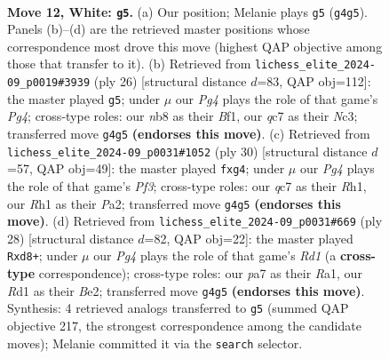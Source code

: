 \documentclass[11pt]{article}
\begin{document}
\clearpage

\begin{figure}[p]\centering
\begin{subfigure}{0.46\textwidth}\centering
\resizebox{\linewidth}{!}{%
\newchessgame
\chessboard[
  setfen={rnb1k2r/ppq1p1bp/3p1np1/4p3/4P1P1/2N1BQ2/PPP2P1P/2KR1B1R w kq - 1 12},
  showmover=false,
  pgfstyle=straightmove, color=movearrow, markmove={g4-g5}
]}
\caption{}
\end{subfigure}\hfill
\begin{subfigure}{0.46\textwidth}\centering
\resizebox{\linewidth}{!}{%
\newchessgame
\chessboard[
  setfen={r1b1kb2/2q2pp1/p1p2n2/1p2p3/4P1Pr/2N1BQ2/PPP2P2/2KR1BR1 w q - 1 14},
  showmover=false,
  pgfstyle=straightmove, color=movearrow, markmove={g4-g5}
]}
\caption{}
\end{subfigure}
\\[4pt]
\begin{subfigure}{0.46\textwidth}\centering
\resizebox{\linewidth}{!}{%
\newchessgame
\chessboard[
  setfen={r1b1k2r/pp2q1b1/2pp3p/4np2/2B2BpP/2N1PP2/PPP1Q1P1/2KR3R w kq - 2 16},
  showmover=false,
  pgfstyle=straightmove, color=movearrow, markmove={f3-g4}
]}
\caption{}
\end{subfigure}\hfill
\begin{subfigure}{0.46\textwidth}\centering
\resizebox{\linewidth}{!}{%
\newchessgame
\chessboard[
  setfen={r1br2k1/2q1bppp/pp2pn2/4p1B1/P3P3/2N1Q3/1PP1BPPP/R2R2K1 w - - 0 15},
  showmover=false,
  pgfstyle=straightmove, color=movearrow, markmove={d1-d8}
]}
\caption{}
\end{subfigure}
\caption{\textbf{Move 12, White: \texttt{g5}.} (a) Our position; Melanie plays \texttt{g5} (\texttt{g4g5}). Panels (b)--(d) are the retrieved master positions whose correspondence most drove this move (highest QAP objective among those that transfer to it). (b) Retrieved from \texttt{lichess\_elite\_2024-09\_p0019\#3939} (ply 26) [structural distance $d$=83, QAP obj=112]: the master played \texttt{g5}; under $\mu$ our \emph{Pg4} plays the role of that game's \emph{Pg4}; cross-type roles: our \emph{n}b8 as their \emph{B}f1, our \emph{q}c7 as their \emph{N}c3; transferred move \texttt{g4g5} \textbf{(endorses this move)}. (c) Retrieved from \texttt{lichess\_elite\_2024-09\_p0031\#1052} (ply 30) [structural distance $d$=57, QAP obj=49]: the master played \texttt{fxg4}; under $\mu$ our \emph{Pg4} plays the role of that game's \emph{Pf3}; cross-type roles: our \emph{q}c7 as their \emph{R}h1, our \emph{R}h1 as their \emph{P}a2; transferred move \texttt{g4g5} \textbf{(endorses this move)}. (d) Retrieved from \texttt{lichess\_elite\_2024-09\_p0031\#669} (ply 28) [structural distance $d$=82, QAP obj=22]: the master played \texttt{Rxd8+}; under $\mu$ our \emph{Pg4} plays the role of that game's \emph{Rd1} (a \textbf{cross-type} correspondence); cross-type roles: our \emph{p}a7 as their \emph{R}a1, our \emph{R}d1 as their \emph{B}e2; transferred move \texttt{g4g5} \textbf{(endorses this move)}. Synthesis: 4 retrieved analogs transferred to \texttt{g5} (summed QAP objective 217, the strongest correspondence among the candidate moves); Melanie committed it via the \texttt{search} selector.}
\label{fig:thought-m22}
\end{figure}
\end{document}

